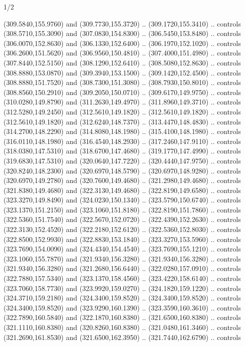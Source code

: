 \begin{flagdescription}{1/2}
\begin{scope}[xshift=0.5\flaglength]
\begin{scope}[scale=0.004\flagwidth,xshift=-90mm,yshift=89mm]
\begin{scope}[y=0.80pt, x=0.80pt, yscale=-1, xscale=1, inner sep=0pt, outer sep=0pt]
  (309.5840,155.9760) and (309.7730,155.3720) .. (309.1720,155.3410) .. controls
  (308.5710,155.3090) and (307.0830,154.8300) .. (306.5450,153.8480) .. controls
  (306.0070,152.8630) and (306.1330,152.6400) .. (306.1970,152.1020) .. controls
  (306.2600,151.5620) and (306.9560,150.4810) .. (307.4000,151.4980) .. controls
  (307.8440,152.5150) and (308.1290,152.6410) .. (308.5080,152.8630) .. controls
  (308.8880,153.0870) and (309.3940,153.1500) .. (309.1420,152.4500) .. controls
  (308.8880,151.7520) and (308.7300,151.3080) .. (308.7930,150.8010) .. controls
  (308.8560,150.2910) and (309.2050,150.0710) .. (309.6170,149.9750) .. controls
  (310.0280,149.8790) and (311.2630,149.4970) .. (311.8960,149.3710) .. controls
  (312.5280,149.2450) and (312.5610,149.1820) .. (312.5610,149.1820) .. controls
  (312.5610,149.1820) and (312.6240,148.7370) .. (313.4470,148.4830) .. controls
  (314.2700,148.2290) and (314.8080,148.1980) .. (315.4100,148.1980) .. controls
  (316.0110,148.1980) and (316.4540,148.2930) .. (317.2460,147.9110) .. controls
  (318.0380,147.5310) and (318.6700,147.4680) .. (319.1770,147.4990) .. controls
  (319.6830,147.5310) and (320.0640,147.7220) .. (320.4440,147.9750) .. controls
  (320.8240,148.2300) and (320.6970,148.5790) .. (320.6970,148.9280) .. controls
  (320.6970,149.2780) and (320.7600,149.4680) .. (321.2980,149.4680) .. controls
  (321.8380,149.4680) and (322.3130,149.4680) .. (322.8190,149.6580) .. controls
  (323.3270,149.8490) and (324.0230,150.1340) .. (323.5790,150.6740) .. controls
  (323.1370,151.2150) and (323.1060,151.8180) .. (322.8190,151.7860) .. controls
  (322.5360,151.7540) and (322.5670,152.0720) .. (322.4390,152.2630) .. controls
  (322.3130,152.4520) and (322.2180,152.6120) .. (322.5360,152.8030) .. controls
  (322.8500,152.9930) and (322.8830,153.1840) .. (323.3270,153.5960) .. controls
  (323.7690,154.0090) and (324.4340,154.4540) .. (323.7690,155.1210) .. controls
  (323.1060,155.7870) and (321.9340,156.3280) .. (321.9340,156.3280) .. controls
  (321.9340,156.3280) and (321.2680,156.6440) .. (322.0280,157.0910) .. controls
  (322.7880,157.5340) and (323.1370,158.4560) .. (323.4220,158.6140) .. controls
  (323.7060,158.7730) and (323.9920,159.0270) .. (324.1820,159.1220) .. controls
  (324.3710,159.2180) and (324.3400,159.8520) .. (324.3400,159.8520) .. controls
  (324.3400,159.8520) and (323.9290,160.1390) .. (323.3590,160.3610) .. controls
  (322.7890,160.5840) and (322.1870,160.8380) .. (321.6500,160.8380) .. controls
  (321.1110,160.8380) and (320.8260,160.8380) .. (321.0480,161.3460) .. controls
  (321.2690,161.8530) and (321.6500,162.3950) .. (321.7440,162.6790) .. controls

\end{scope}
\end{scope}
\end{scope}
\end{flagdescription}
